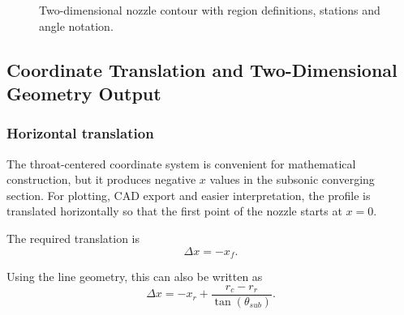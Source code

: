 \documentclass[journal,article,submit,oneauthor]{Definitions/mdpi}
\begin{document}
\begin{figure}[H]
\caption{Two-dimensional nozzle contour with region definitions, stations and angle notation.}
\label{fig:nozzle_piecewise_tikz}
\end{figure}

\subsection{Coordinate Translation and Two-Dimensional Geometry Output}

\subsubsection{Horizontal translation}

The throat-centered coordinate system is convenient for mathematical construction, but it produces negative $x$ values in the subsonic converging section. For plotting, CAD export and easier interpretation, the profile is translated horizontally so that the first point of the nozzle starts at $x=0$.

The required translation is
\begin{equation}
\Delta x=-x_f.
\label{eq:translation_simple}
\end{equation}

Using the line geometry, this can also be written as
\begin{equation}
\Delta x=-x_r+\frac{r_c-r_r}{\tan(\theta_{sub})}.
\label{eq:translation}
\end{equation}
\end{document}
